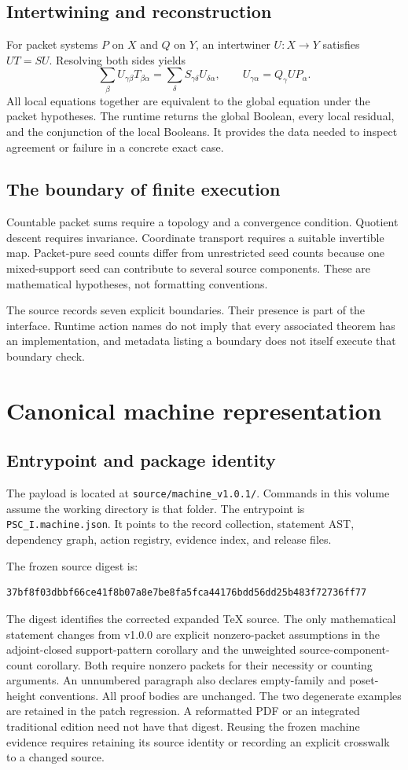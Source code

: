 \documentclass[a4paper,11pt]{article}
\begin{document}
\subsection{Intertwining and reconstruction}
For packet systems $P$ on $X$ and $Q$ on $Y$, an intertwiner $U:X\to Y$ satisfies $UT=SU$. Resolving both sides yields
\[
\sum_\beta U_{\gamma\beta}T_{\beta\alpha}
=
\sum_\delta S_{\gamma\delta}U_{\delta\alpha},
\qquad U_{\gamma\alpha}=Q_\gamma UP_\alpha.
\]
All local equations together are equivalent to the global equation under the packet hypotheses. The runtime returns the global Boolean, every local residual, and the conjunction of the local Booleans. It provides the data needed to inspect agreement or failure in a concrete exact case.
\subsection{The boundary of finite execution}
Countable packet sums require a topology and a convergence condition. Quotient descent requires invariance. Coordinate transport requires a suitable invertible map. Packet-pure seed counts differ from unrestricted seed counts because one mixed-support seed can contribute to several source components. These are mathematical hypotheses, not formatting conventions.

The source records seven explicit boundaries. Their presence is part of the interface. Runtime action names do not imply that every associated theorem has an implementation, and metadata listing a boundary does not itself execute that boundary check.

\section{Canonical machine representation}
\subsection{Entrypoint and package identity}
The payload is located at \nolinkurl{source/machine_v1.0.1/}. Commands in this volume assume the working directory is that folder. The entrypoint is \nolinkurl{PSC_I.machine.json}. It points to the record collection, statement AST, dependency graph, action registry, evidence index, and release files.

The frozen source digest is:
\begin{lstlisting}
37bf8f03dbbf66ce41f8b07a8e7be8fa5fca44176bdd56dd25b483f72736ff77
\end{lstlisting}
The digest identifies the corrected expanded TeX source. The only mathematical statement changes from v1.0.0 are explicit nonzero-packet assumptions in the adjoint-closed support-pattern corollary and the unweighted source-component-count corollary. Both require nonzero packets for their necessity or counting arguments. An unnumbered paragraph also declares empty-family and poset-height conventions. All proof bodies are unchanged. The two degenerate examples are retained in the patch regression. A reformatted PDF or an integrated traditional edition need not have that digest. Reusing the frozen machine evidence requires retaining its source identity or recording an explicit crosswalk to a changed source.
\end{document}
